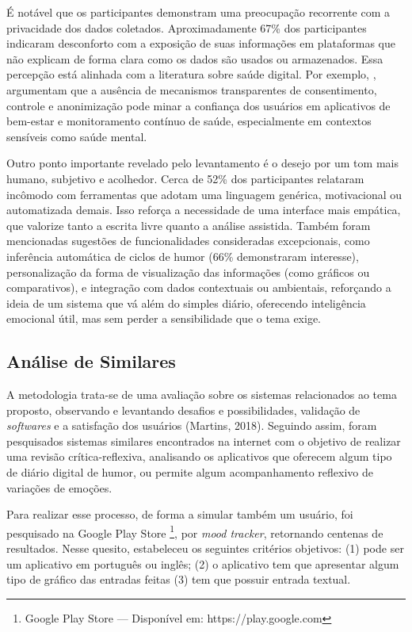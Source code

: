 É notável que os participantes demonstram uma preocupação recorrente com a
privacidade dos dados coletados. Aproximadamente 67\% dos participantes
indicaram desconforto com a exposição de suas informações em plataformas que
não explicam de forma clara como os dados são usados ou armazenados. Essa
percepção está alinhada com a literatura sobre saúde digital. Por exemplo,
\cite{Iwaya:22}, argumentam que a ausência de mecanismos transparentes de
consentimento, controle e anonimização pode minar a confiança dos usuários em
aplicativos de bem-estar e monitoramento contínuo de saúde, especialmente em
contextos sensíveis como saúde mental.

Outro ponto importante revelado pelo levantamento é o desejo por um tom mais
humano, subjetivo e acolhedor. Cerca de 52\% dos participantes relataram
incômodo com ferramentas que adotam uma linguagem genérica, motivacional ou
automatizada demais. Isso reforça a necessidade de uma interface mais empática,
que valorize tanto a escrita livre quanto a análise assistida. Também foram
mencionadas sugestões de funcionalidades consideradas excepcionais, como
inferência automática de ciclos de humor (66\% demonstraram interesse),
personalização da forma de visualização das informações (como gráficos ou
comparativos), e integração com dados contextuais ou ambientais, reforçando a
ideia de um sistema que vá além do simples diário, oferecendo inteligência
emocional útil, mas sem perder a sensibilidade que o tema exige.

\subsection{Análise de Similares}

A metodologia trata-se de uma avaliação sobre os sistemas relacionados ao tema
proposto, observando e levantando desafios e possibilidades, validação de
\textit{softwares} e a satisfação dos usuários (Martins, 2018). Seguindo assim,
foram pesquisados sistemas similares encontrados na internet com o objetivo de
realizar uma revisão crítica-reflexiva, analisando os aplicativos que oferecem
algum tipo de diário digital de humor, ou permite algum acompanhamento
reflexivo de variações de emoções.

Para realizar esse processo, de forma a simular também um usuário, foi
pesquisado na Google Play Store \footnote{Google Play Store — Disponível em:
https://play.google.com}, por \textit{mood tracker}, retornando centenas de
resultados. Nesse quesito, estabeleceu os seguintes critérios objetivos: (1)
pode ser um aplicativo em português ou inglês; (2) o aplicativo tem que
apresentar algum tipo de gráfico das entradas feitas (3) tem que possuir
entrada textual.

